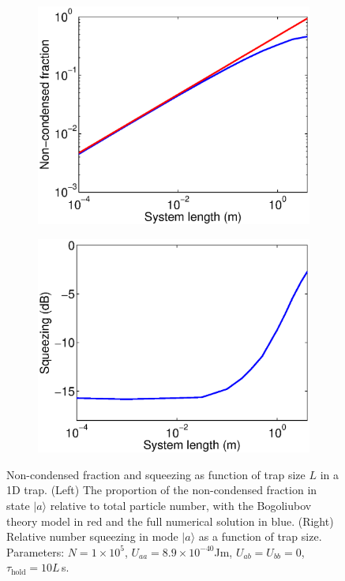 \documentclass{iopart}
\begin{document}
\begin{figure}
  \centering
  \begin{subfigure}{.48\textwidth}
    \centering
    \includegraphics[width=\textwidth]{figures/1D_Bog_mode_occupation_scaling.eps}
  \end{subfigure}
  \begin{subfigure}{.48\textwidth}
    \centering
    \includegraphics[width=\textwidth]{figures/1D_squeezing_scaling.eps}
  \end{subfigure}
\caption{Non-condensed fraction and squeezing as function of trap size $L$ in a 1D trap. (Left) The proportion of the non-condensed fraction in state $|a\rangle$ relative to total particle number, with the Bogoliubov theory model in red and the full numerical solution in blue. (Right) Relative number squeezing in mode $|a\rangle$ as a function of trap size. Parameters: $N=1\times 10^5$, $U_{aa} = 8.9\times 10^{-40}$Jm, $U_{ab}=U_{bb}=0$, $\tau_{\mathrm{hold}} = 10L$\,s.}
  \label{fig1D_squeezing_and_bog_scaling}
\end{figure}
\end{document}
